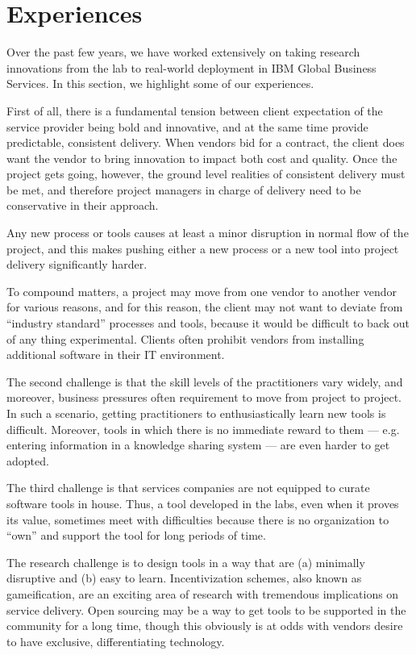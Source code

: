 \section{Experiences}

Over the past few years, we have worked extensively on taking research innovations from the lab to real-world deployment in IBM Global Business Services. In this section, we highlight some of our experiences.

First of all, there is a fundamental tension between client expectation of the service provider being bold and innovative, and at the same time provide predictable, consistent delivery.  When vendors bid for a contract, the client does want the vendor to bring innovation to impact both cost and quality. Once the project gets going, however, the ground level realities of consistent delivery must be met, and therefore project managers in charge of delivery need to be conservative in their approach.

Any new process or tools causes at least a minor disruption in normal flow of the project, and this makes pushing either a new process or a new tool into project delivery significantly harder.  

To compound matters, a project may move from one vendor to another vendor for various reasons, and for this reason, the client may not want to deviate from ``industry standard'' processes and tools, because it would be difficult to back out of any thing experimental. Clients often prohibit vendors from installing additional software in their IT environment.

The second challenge is that the skill levels of the practitioners vary widely, and moreover, business pressures often requirement to move from project to project. In such a scenario, getting practitioners to enthusiastically learn new tools is difficult.  Moreover, tools in which there is no immediate reward to them --- e.g. entering information in a knowledge sharing system --- are even harder to get adopted.

The third challenge is that services companies are not equipped to curate software tools in house. Thus, a tool developed in the labs, even when it proves its value, sometimes meet with difficulties because there is no organization to ``own'' and support the tool for long periods of time.

The research challenge is to design tools in a way that are (a) minimally disruptive and (b) easy to learn. Incentivization schemes, also known as gameification, are an exciting area of research with tremendous implications on service delivery.  Open sourcing may be a way to get tools to be supported in the community for a long time, though this obviously is at odds with vendors desire to have exclusive, differentiating technology.
